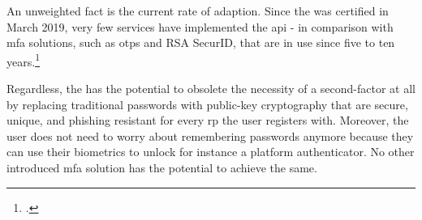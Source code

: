 An unweighted fact is the current rate of adaption. Since the \wa{} was certified in March 2019, very few services have implemented the \gls{api} - in comparison with \gls{mfa} solutions, such as \glspl{otp} and RSA SecurID, that are in use since five to ten years.\footcites[See][]{works-with-yubico}
 
Regardless, the \wa{} has the potential to obsolete the necessity of a second-factor at all by replacing traditional passwords with public-key cryptography that are secure, unique, and phishing resistant for every \gls{rp} the user registers with. Moreover, the user does not need to worry about remembering passwords anymore because they can use their biometrics to unlock for instance a platform authenticator. No other introduced \gls{mfa} solution has the potential to achieve the same.
